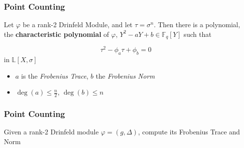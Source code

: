 \documentclass{beamer}
\newcommand{\f}{\mathbb{F}}
\begin{document}







\begin{frame}
\frametitle{Point Counting}

\begin{theorem}[Gekeler, 1991]
Let $\varphi$ be a rank-2 Drinfeld Module, and let $\tau = \sigma^n$. Then there is a polynomial, the \textbf{characteristic polynomial} of $\varphi$,  $Y^2 - aY +b \in \mathbb{F}_q[Y]$ such that

\[\tau^2 -\phi_a\tau + \phi_b = 0\]
in $\mathbb{L}[X,\sigma]$
\end{theorem}

\begin{itemize}
    \item $a$ is the \textit{Frobenius Trace}, $b$ the \textit{Frobenius Norm}
    \item $\deg(a) \leq \frac{n}{2}$, $\deg(b) \leq n$
\end{itemize}

\end{frame}


\begin{frame}
\frametitle{Point Counting}

\begin{problem}
Given a rank-2 Drinfeld module $\varphi = (g,\Delta)$, compute its Frobenius Trace and Norm
\end{problem}

\end{frame}




\end{document}
